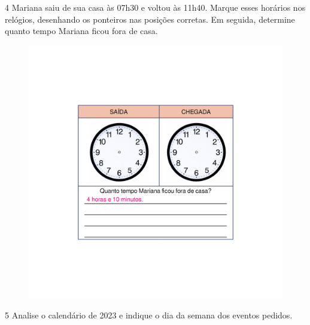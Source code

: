 \num{4} Mariana saiu de sua casa às 07h30 e voltou às 11h40. Marque esses
horários nos relógios, desenhando os ponteiros nas posições
corretas. Em seguida, determine quanto tempo Mariana ficou fora de casa.

\begin{figure}[H]
\centering
\includegraphics[width=.65\textwidth]{./media/image54_prof.png}
\end{figure}



\num{5} Analise o calendário de 2023 e indique o dia da semana dos eventos pedidos.


